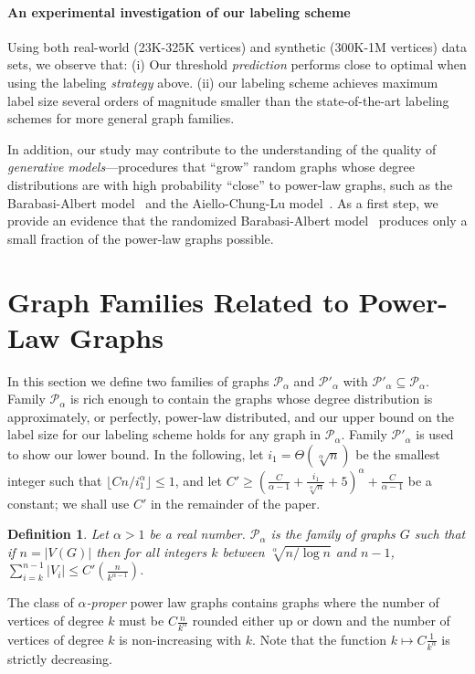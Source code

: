 \documentclass{article}
\newtheorem{definition}{Definition}
\theoremstyle{remark}
\newcommand{\PLB}{\ensuremath{ \mathcal{P}_{\alpha}}}
\newcommand{\PLC}{\ensuremath{ \mathcal{P}'_{\alpha}}}
\begin{document}
\paragraph{An experimental investigation  of our labeling scheme}
Using both real-world (23K-325K vertices) and synthetic (300K-1M vertices) data sets, we observe that:
(i) Our threshold \emph{prediction} performs close to optimal when using the labeling \emph{strategy} above. 
(ii) our labeling scheme achieves maximum label size several orders of magnitude smaller than the state-of-the-art labeling schemes for more general graph families.
\vspace{\baselineskip}

In addition, our study  may contribute to  the understanding of the quality of  \emph{generative models}---procedures that ``grow'' random graphs whose degree distributions are with high probability ``close'' to power-law graphs,  such as the Barabasi-Albert model~\cite{barabasi1999emergence} and the   Aiello-Chung-Lu model~\cite{aiello2001random}. As a first step, we provide an evidence  that the randomized Barabasi-Albert model~\cite{barabasi1999emergence} produces only a small fraction of the power-law graphs possible.
 \section{Graph Families Related to Power-Law Graphs}\label{Sec:GraphFamilies}
In this section we define two families of graphs $\PLB$ and $\PLC$ with $\PLC\subseteq\PLB$. Family $\PLB$ is rich enough to contain the graphs whose degree distribution is approximately, or perfectly, power-law distributed, and our upper bound on the label size for our labeling scheme holds for any graph in $\PLB$. Family $\PLC$ is used to show our lower bound. In the following, let $i_1 = \Theta(\sqrt[\alpha]n)$ be the smallest integer such that $\lfloor Cn/i_1^\alpha\rfloor \leq 1$, and let $C'\geq(\frac C{\alpha-1} + \frac{i_1}{\sqrt[\alpha] n} + 5)^{\alpha} + \frac{C}{\alpha - 1}$ be a constant; we shall use $C'$ in the remainder of the paper.
\begin{definition} \label{def:general-family}
Let $\alpha > 1$ be a real number. $\PLB$ is the family of graphs $G$ such that if $n = \vert V(G)\vert$ then for all integers $k$ between $\sqrt[\alpha]{n/\log n}$ and $n-1$, $\sum_{i = k}^{n-1} {\vert V_i\vert} \leq C'(\frac{n}{k^{\alpha-1}})$.
\end{definition}

The class of $\alpha$\emph{-proper} power law graphs contains graphs where  the number of vertices of degree $k$
must be $C \frac{n}{k^{\alpha}}$ rounded either up or down and the number of vertices of degree $k$ is non-increasing
with $k$. Note that the function $k \mapsto  C \frac{1}{k^{\alpha}}$ is strictly decreasing.
 
\end{document}
